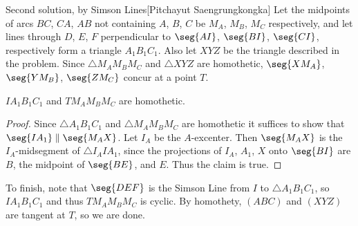 \begin{customenv}{Second solution, by Simson Lines}[Pitchayut Saengrungkongka]
    Let the midpoints of arcs $BC$, $CA$, $AB$ not containing $A$, $B$, $C$ be $M_A$, $M_B$, $M_C$ respectively, and let lines through $D$, $E$, $F$ perpendicular to $\seg{AI}$, $\seg{BI}$, $\seg{CI}$, respectively form a triangle $A_1B_1C_1$. Also let $XYZ$ be the triangle described in the problem. Since $\triangle M_AM_BM_C$ and $\triangle XYZ$ are homothetic, $\seg{XM_A}$, $\seg{YM_B}$, $\seg{ZM_C}$ concur at a point $T$.
    \begin{iclaim*}
        $IA_1B_1C_1$ and $TM_AM_BM_C$ are homothetic.
    \end{iclaim*}
    \begin{proof}
        Since $\triangle A_1B_1C_1$ and $\triangle M_AM_BM_C$ are homothetic it suffices to show that $\seg{IA_1}\parallel\seg{M_AX}$. Let $I_A$ be the $A$-excenter. Then $\seg{M_AX}$ is the $I_A$-midsegment of $\triangle I_AIA_1$, since the projections of $I_A$, $A_1$, $X$ onto $\seg{BI}$ are $B$, the midpoint of $\seg{BE}$, and $E$. Thus the claim is true.
    \end{proof}

    To finish, note that $\seg{DEF}$ is the Simson Line from $I$ to $\triangle A_1B_1C_1$, so $IA_1B_1C_1$ and thus $TM_AM_BM_C$ is cyclic. By homothety, $(ABC)$ and $(XYZ)$ are tangent at $T$, so we are done. 
\end{customenv}

